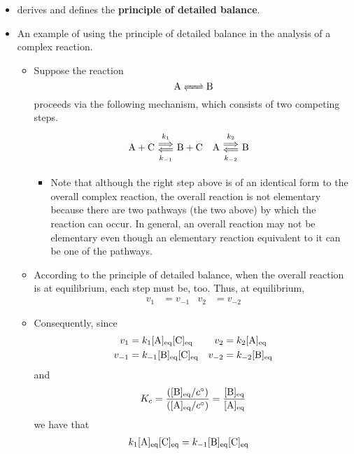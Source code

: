 \documentclass[../notes.tex]{subfiles}
\begin{document}
\begin{itemize}
    \item \textcite{bib:McQuarrieSimon} derives and defines the \textbf{principle of detailed balance}.
    \item An example of using the principle of detailed balance in the analysis of a complex reaction.
    \begin{itemize}
        \item Suppose the reaction
        \begin{equation*}
            \ce{A <=> B}
        \end{equation*}
        proceeds via the following mechanism, which consists of two competing steps.
        \begin{align*}
            \ce{A + C} &\Longleftrightarrows[k_1][k_{-1}] \ce{B + C}&
            \ce{A} &\Longleftrightarrows[k_2][k_{-2}] \ce{B}
        \end{align*}
        \begin{itemize}
            \item Note that although the right step above is of an identical form to the overall complex reaction, the overall reaction is not elementary because there are two pathways (the two above) by which the reaction can occur. In general, an overall reaction may not be elementary even though an elementary reaction equivalent to it can be one of the pathways.
        \end{itemize}
        \item According to the principle of detailed balance, when the overall reaction is at equilibrium, each step must be, too. Thus, at equilibrium, 
        \begin{align*}
            v_1 &= v_{-1}&
            v_2 &= v_{-2}
        \end{align*}
        \item Consequently, since
        \begin{align*}
            v_1 &= k_1\cnc[eq]{A}\cnc[eq]{C}&
                v_2 &= k_2\cnc[eq]{A}\\
            v_{-1} &= k_{-1}\cnc[eq]{B}\cnc[eq]{C}&
                v_{-2} &= k_{-2}\cnc[eq]{B}
        \end{align*}
        and
        \begin{equation*}
            K_c = \frac{(\cnc[eq]{B}/c^\circ)}{(\cnc[eq]{A}/c^\circ)}
            = \frac{\cnc[eq]{B}}{\cnc[eq]{A}}
        \end{equation*}
        we have that
        \begin{align*}
            k_1\cnc[eq]{A}\cnc[eq]{C} &= k_{-1}\cnc[eq]{B}\cnc[eq]{C}&

\end{align*}
\end{itemize}
\end{itemize}
\end{document}
